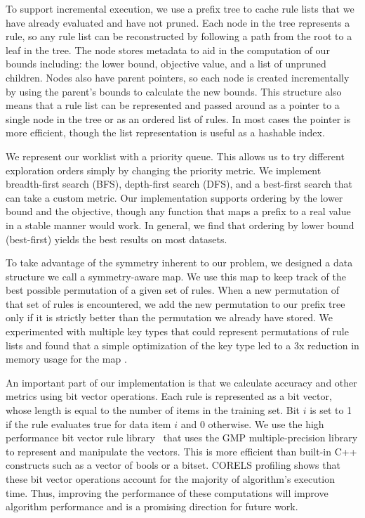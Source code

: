 \documentclass[format=sigconf]{acmart}
\begin{document}
To support incremental execution, we use a prefix tree to cache rule lists that we have already evaluated and have not pruned.
Each node in the tree represents a rule, so any rule list can be reconstructed by following a path from the root to a leaf in the tree.
The node stores metadata to aid in the computation of our bounds including: the lower bound, objective value, and a list of unpruned children.
Nodes also have parent pointers, so each node is created incrementally by using the parent's bounds to calculate the new bounds.
This structure also means that a rule list can be represented and passed around as a pointer to a single node in the tree or as an ordered list of rules.
In most cases the pointer is more efficient, though the list representation is useful as a hashable index.

We represent our worklist with a priority queue.
This allows us to try different exploration orders simply by changing the priority metric.
We implement breadth-first search (BFS), depth-first search (DFS), and a best-first search that can take a custom metric.
Our implementation supports ordering by the lower bound and the objective, though any function that maps a prefix to a real value in a stable manner would work.
In general, we find that ordering by lower bound (best-first) yields the best results on most datasets.

To take advantage of the symmetry inherent to our problem, we designed a data structure we call a symmetry-aware map.
We use this map to keep track of the best possible permutation of a given set of rules.
When a new permutation of that set of rules is encountered, we add the new permutation to our prefix tree only if it is strictly better than the permutation we already have stored.
We experimented with multiple key types that could represent permutations of rule lists and found that a simple optimization of the key type led to a 3x reduction in memory usage for the map \cite{Larus-Stone17}.

An important part of our implementation is that we calculate accuracy and other metrics using bit vector operations.
Each rule is represented as a bit vector, whose length is equal to the number of items in the training set. 
Bit $i$ is set to 1 if the rule evaluates true for data item $i$ and 0 otherwise.
We use the high performance bit vector rule library~\cite{YangRuSe16}
that uses the GMP multiple-precision library to represent and manipulate the vectors.
This is more efficient than built-in C++ constructs such as a vector of bools or a bitset.
CORELS profiling shows that these bit vector operations account for
the majority of algorithm's execution time.
Thus, improving the performance of these computations will improve algorithm performance and is a promising direction for future work.
\end{document}
